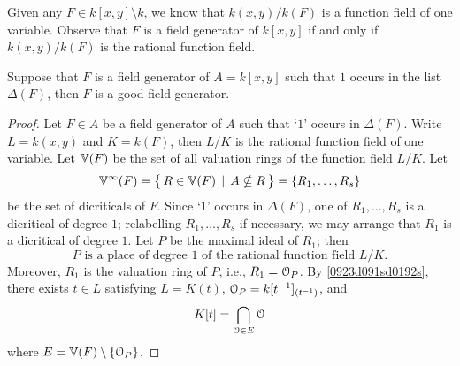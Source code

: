 \begin{remark}
	Given any $F \in  k[x,y] \setminus  k$, we know that
	$ k(x,y) /  k(F)$ is a function field
	of one variable. Observe that $F$ is a field generator 
	of $ k[x,y]$ if and only if 
	$ k(x,y) /  k(F)$ is the rational function field.
\end{remark}

\begin{proposition}
	Suppose that $F$ is a field generator of $A= k[x,y]$ 
	such that $1$ occurs in the list $\Delta(F)$, then $F$ is a 
	good field generator.
\end{proposition}

\begin{proof}
	Let $F \in A$ be a field generator of $A$ such that 
	`$1$' occurs in $\Delta(F)$.
	Write $L =  k(x,y)$ and $K =  k(F)$, then $L/K$ is the 
	rational function field of one variable.
	Let $\mathbb{V}(F)$ be the set of all valuation rings of the 
	function field $L/K$.
	Let 
	$$
	\mathbb{V}^\infty(F) = \big\{\, R \in \mathbb{V}(F) \, \mid \, A \nsubseteq R \, \big\} = \{ R_1, \dots, R_s \}
	$$
	be the set of dicriticals of $F$. Since `$1$' occurs in
	$\Delta(F)$, one of $R_1, \dots, R_s$
	is a dicritical of degree $1$; relabelling  $R_1, \dots, R_s$ 
	if necessary, we may arrange that
	$R_1$ is a dicritical of degree $1$. Let  $P$ be the maximal 
	ideal of $R_1$; then
	$$
	\text{$P$ is a place of degree $1$ of the rational function field $L/K$.}
	$$
	Moreover, $R_1$ is the valuation ring of $P$, i.e., $R_1 = \EuScript{O}_P$.
	By \ref{0923d091sd0192s}, there exists $t \in L$ satisfying
	$L = K(t)$, $\EuScript{O}_P =  k[ t^{-1} ]_{(t^{-1})}$, and
	\begin{equation} \label {uqid7623erih9we8}
	K[t] = \bigcap_{\EuScript{O} \in E} \EuScript{O}
	\end{equation}
	where $E = \mathbb{V}(F) \setminus \{ \EuScript{O}_P \}$.


\end{proof}
